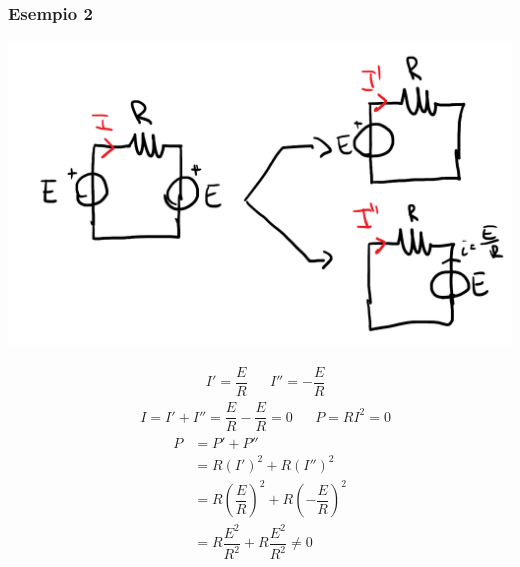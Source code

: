 \documentclass{article}
\begin{document}
\subsubsection{Esempio 2}
\begin{center}
    \includegraphics[scale=0.3]{Image/Esempio_MetAnalisi_4.png}
\end{center}
\begin{align*}
    &I'= \dfrac{E}{R} & &I'' = - \dfrac{E}{R}
\end{align*}
\begin{align*}
    &I = I' + I'' = \dfrac{E}{R} - \dfrac{E}{R} = 0 & &P=RI^2 = 0
\end{align*}
\begin{align*}
    P &= P' + P'' \\
    &= R (I')^2 + R(I'')^2 \\
    &= R \left( \dfrac{E}{R}\right)^2 + R \left(- \dfrac{E}{R}\right)^2\\
    &=R \dfrac{E^2}{R^2} + R \dfrac{E^2}{R^2} \neq 0
\end{align*}
\end{document}
